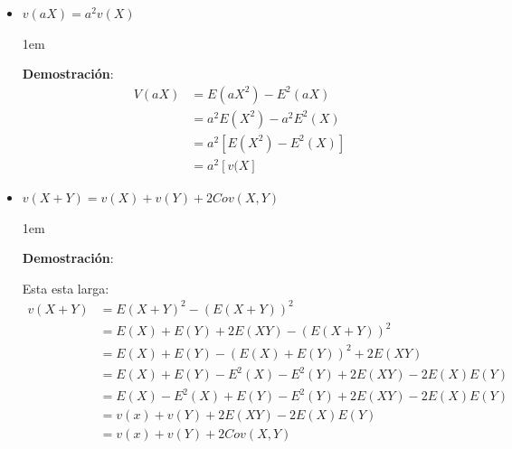 \documentclass[12pt, fleqn]{report}                             %
\newenvironment{SmallIndentation}[1][0.75em]                    %
        {\begin{adjustwidth}{#1}{}\begin{footnotesize}}             %
        {\end{footnotesize}\end{adjustwidth}}                       %
\theoremstyle{break}                                            %
\begin{document}
\begin{itemize}
\begin{SmallIndentation}[1em]
                        \end{SmallIndentation}

                    \item 
                        $v(aX) = a^2 v(X)$

                        \begin{SmallIndentation}[1em]
                            \textbf{Demostración}:
                            \begin{align*}
                                V(aX) 
                                    &= E(aX^2) - E^2(aX)       \\
                                    &= a^2 E(X^2) - a^2E^2(X)  \\
                                    &= a^2 [E(X^2) - E^2(X)]   \\
                                    &= a^2 [v(X]          
                            \end{align*}
                        
                        \end{SmallIndentation}


                    \item 
                        $v(X + Y) = v(X) + v(Y) + 2Cov(X,Y)$

                        \begin{SmallIndentation}[1em]
                            \textbf{Demostración}:
                            
                            Esta esta larga:
                            \begin{align*}
                                v(X + Y) 
                                    &= E(X + Y)^2 - (E(X+Y))^2                              \\
                                    &= E(X) + E(Y) + 2E(XY) - (E(X+Y))^2                    \\
                                    &= E(X) + E(Y) - (E(X)+E(Y))^2 + 2E(XY)                 \\
                                    &= E(X) + E(Y) - E^2(X)-E^2(Y) + 2E(XY) -2E(X)E(Y)      \\
                                    &= E(X) - E^2(X) + E(Y)-E^2(Y) + 2E(XY) -2E(X)E(Y)      \\
                                    &= v(x) + v(Y) + 2E(XY) - 2E(X)E(Y)                     \\
                                    &= v(x) + v(Y) + 2Cov(X, Y) 
                            \end{align*}
                        

\end{SmallIndentation}
\end{itemize}
\end{document}
